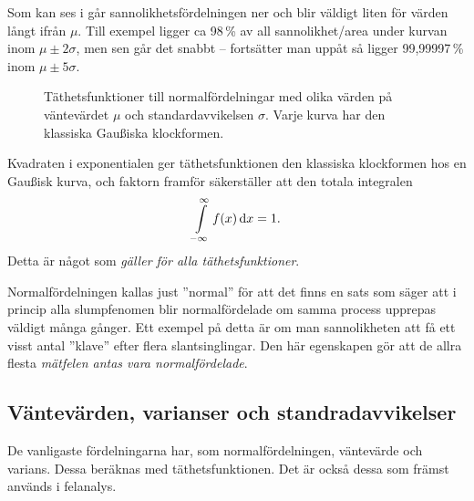 \documentclass[11pt,a4paper, english, swedish
]{article}
\begin{document}
Som kan ses i  går sannolikhetsfördelningen
ner och blir väldigt liten för värden långt ifrån $\mu$. Till exempel
ligger ca 98\,\% av all sannolikhet/area under kurvan inom $\mu\pm
2\sigma$, men sen går det snabbt -- fortsätter man uppåt så ligger
99,99997\,\% inom $\mu\pm 5\sigma$.

\begin{figure}
\centering

\caption{Täthetsfunktioner till normalfördelningar med olika värden på
väntevärdet $\mu$ och standardavvikelsen $\sigma$. Varje kurva har den
klassiska Gau\ss{}iska klockformen.}\label{fig:normal_dist}
\end{figure}

Kvadraten i exponentialen ger täthetsfunktionen den
klassiska klockformen hos en Gau\ss{}isk kurva, och faktorn framför
säkerställer att den totala integralen
\begin{equation}
\int_{-\infty}^{\infty} f(x)\id{x} = 1.
\end{equation}
Detta är något som \emph{gäller för alla täthetsfunktioner}. 


Normalfördelningen kallas just ''normal'' för att det finns en sats
som säger att i princip alla slumpfenomen blir normalfördelade om
samma process upprepas väldigt många gånger. Ett exempel på detta är
om man sannolikheten att få ett visst antal ''klave'' efter flera
slantsinglingar. Den här egenskapen gör att de allra flesta 
\emph{mätfelen antas vara normalfördelade}.



\subsection{Väntevärden, varianser och standradavvikelser}
De vanligaste fördelningarna har, som normalfördelningen, väntevärde
och varians. Dessa beräknas med täthetsfunktionen. Det är också dessa
som främst används i felanalys.
\end{document}
